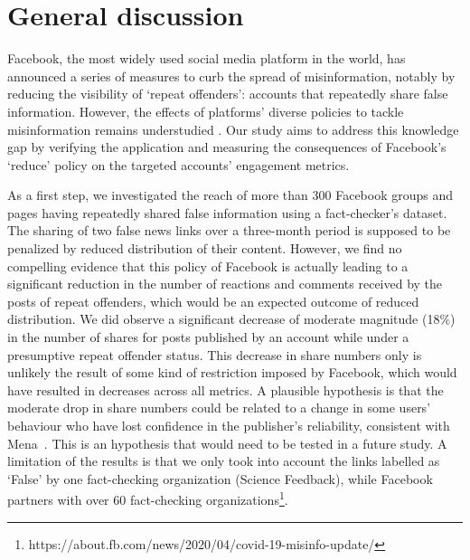 \documentclass[11pt,a4paper]{article}
\begin{document}

\section{General discussion}

Facebook, the most widely used social media platform in the world, has announced a series of measures to curb the spread of misinformation, notably by reducing the visibility of `repeat offenders': accounts that repeatedly share false information. However, the effects of platforms' diverse policies to tackle misinformation remains understudied \citep{pasquetto2020tackling}. Our study aims to address this knowledge gap by verifying the application and measuring the consequences of Facebook's `reduce' policy on the targeted accounts' engagement metrics.

As a first step, we investigated the reach of more than 300 Facebook groups and pages having repeatedly shared false information using a fact-checker's dataset. The sharing of two false news links over a three-month period is supposed to be penalized by reduced distribution of their content. However, we find no compelling evidence that this policy of Facebook is actually leading to a significant reduction in the number of reactions and comments received by the posts of repeat offenders, which would be an expected outcome of reduced distribution. We did observe a significant decrease of moderate magnitude (18\%) in the number of shares for posts published by an account while under a presumptive repeat offender status. This decrease in share numbers only is unlikely the result of some kind of restriction imposed by Facebook, which would have resulted in decreases across all metrics. A plausible hypothesis is that the moderate drop in share numbers could be related to a change in some users’ behaviour who have lost confidence in the publisher’s reliability, consistent with Mena~. This is an hypothesis that would need to be tested in a future study. A limitation of the results is that we only took into account the links labelled as `False' by one fact-checking organization (Science Feedback), while Facebook partners with over 60 fact-checking organizations\footnote{https://about.fb.com/news/2020/04/covid-19-misinfo-update/}.
\end{document}
